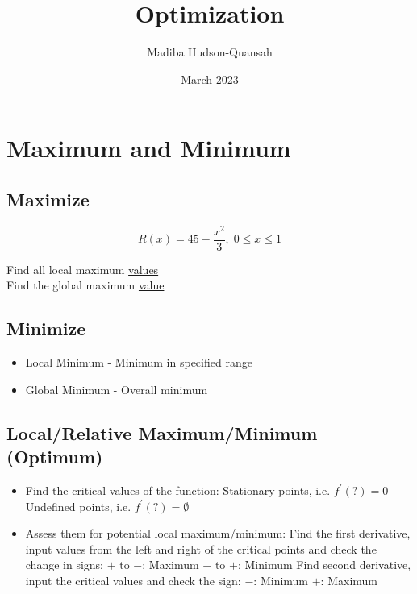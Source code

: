 \documentclass[12pt letter]{report}
\title{\Huge{Optimization}}
\author{\huge{Madiba Hudson-Quansah}}
\date{March 2023}
\begin{document}
\maketitle
\newpage
{}
\tableofcontents
\pagebreak

\chapter{Maximum and Minimum}

\section{Maximize}
\[
	R(x) = 45 - \frac{x^2}{3}, \; 0 \leq x \leq 1
\]
\begin{center}
	Find all local maximum \underline{values}\\
	Find the global maximum \underline{value}
\end{center}

\section{Minimize}

\begin{itemize}
	\item Local Minimum - Minimum in specified range
	\item Global Minimum - Overall minimum
\end{itemize}

\section{Local/Relative Maximum/Minimum (Optimum)}

\begin{itemize}
	\item Find the critical values of the function:
	      \subitem Stationary points, i.e. $f^{\prime}(?) = 0$
	      \subitem Undefined points, i.e. $f^{\prime}(?) = \emptyset$
	\item Assess them for potential local maximum/minimum:
	      \subitem Find the first derivative, input values from the left and right of the critical points and check the change in signs:
	      \subsubitem $+$ to $-$: Maximum
	      \subsubitem $-$ to $+$: Minimum
	      \subitem Find second derivative, input the critical values and check the sign:
	      \subsubitem $-$: Minimum
	      \subsubitem $+$: Maximum
\end{itemize}
\pagebreak
\end{document}

